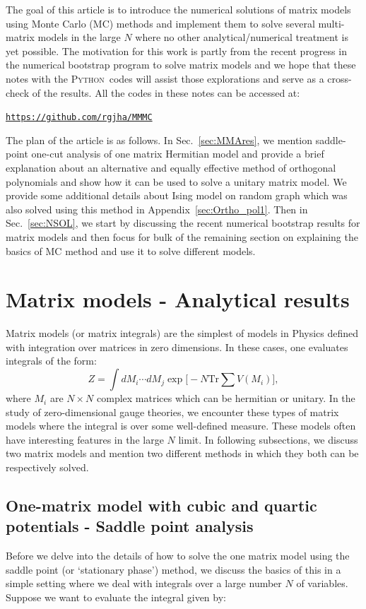 \documentclass[letter,11pt]{article}
\newcommand{\PY}{\textsc{Python}}
\begin{document}
The goal of this article is to introduce the numerical solutions of matrix models using Monte Carlo (MC) methods and implement them to solve several multi-matrix 
models in the large $N$ where no other analytical/numerical treatment is yet possible. The motivation for this work is partly from the recent progress in the numerical bootstrap program to solve matrix models and we hope that these notes with the \PY~codes will assist those explorations and serve as a cross-check of the results. All the codes in these notes can be accessed at:  
\begin{center} \texttt{\href{https://github.com/rgjha/MMMC}{https://github.com/rgjha/MMMC}} \end{center}
The plan of the article is as follows. In Sec.~\ref{sec:MMAres}, we mention saddle-point one-cut analysis of one matrix Hermitian model and provide a brief explanation about an alternative and equally effective
method of orthogonal polynomials and show how it can be used to 
solve a unitary matrix model. We provide some additional details about Ising model on random graph 
which was also solved using this method in Appendix~\ref{sec:Ortho_pol1}. 
Then in Sec.~\ref{sec:NSOL}, we start by discussing the recent 
numerical bootstrap results for matrix models and then focus for bulk of the 
remaining section on explaining the basics of MC method and use it to solve different models. 


\section{\label{sec:MMAres}Matrix models - Analytical results} 
Matrix models (or matrix integrals) are the simplest of models in Physics 
defined with integration over matrices in zero dimensions. 
In these cases, one evaluates integrals of the form:
\begin{equation}
Z = \int dM_{i} \cdots dM_{j} \exp\Bigg[-N \mathrm{Tr} \sum V(M_{i})\Bigg] ,
\end{equation}
where $M_{i}$ are $N \times N$ complex matrices which can be hermitian or unitary.  
In the study of zero-dimensional gauge theories, we encounter these types of matrix models 
where the integral is over some well-defined measure. These models often have interesting features in the 
large $N$ limit. In following subsections, we discuss two matrix models and mention two different methods in which they both can be respectively solved.

\subsection{One-matrix model with cubic and quartic potentials - Saddle point analysis}
Before we delve into the details of how to solve the one matrix model using the 
saddle point (or `stationary phase') method, we discuss the basics of this in a simple setting where we deal with integrals over a large number $N$ of variables. Suppose we want to evaluate the integral given by:
\end{document}
